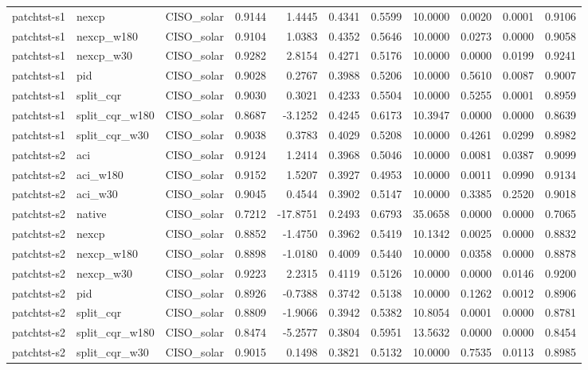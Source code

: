 \begin{tabular}{lllrrrrrrrr}
patchtst-s1 & nexcp & CISO_solar & 0.9144 & 1.4445 & 0.4341 & 0.5599 & 10.0000 & 0.0020 & 0.0001 & 0.9106 \\
patchtst-s1 & nexcp_w180 & CISO_solar & 0.9104 & 1.0383 & 0.4352 & 0.5646 & 10.0000 & 0.0273 & 0.0000 & 0.9058 \\
patchtst-s1 & nexcp_w30 & CISO_solar & 0.9282 & 2.8154 & 0.4271 & 0.5176 & 10.0000 & 0.0000 & 0.0199 & 0.9241 \\
patchtst-s1 & pid & CISO_solar & 0.9028 & 0.2767 & 0.3988 & 0.5206 & 10.0000 & 0.5610 & 0.0087 & 0.9007 \\
patchtst-s1 & split_cqr & CISO_solar & 0.9030 & 0.3021 & 0.4233 & 0.5504 & 10.0000 & 0.5255 & 0.0001 & 0.8959 \\
patchtst-s1 & split_cqr_w180 & CISO_solar & 0.8687 & -3.1252 & 0.4245 & 0.6173 & 10.3947 & 0.0000 & 0.0000 & 0.8639 \\
patchtst-s1 & split_cqr_w30 & CISO_solar & 0.9038 & 0.3783 & 0.4029 & 0.5208 & 10.0000 & 0.4261 & 0.0299 & 0.8982 \\
patchtst-s2 & aci & CISO_solar & 0.9124 & 1.2414 & 0.3968 & 0.5046 & 10.0000 & 0.0081 & 0.0387 & 0.9099 \\
patchtst-s2 & aci_w180 & CISO_solar & 0.9152 & 1.5207 & 0.3927 & 0.4953 & 10.0000 & 0.0011 & 0.0990 & 0.9134 \\
patchtst-s2 & aci_w30 & CISO_solar & 0.9045 & 0.4544 & 0.3902 & 0.5147 & 10.0000 & 0.3385 & 0.2520 & 0.9018 \\
patchtst-s2 & native & CISO_solar & 0.7212 & -17.8751 & 0.2493 & 0.6793 & 35.0658 & 0.0000 & 0.0000 & 0.7065 \\
patchtst-s2 & nexcp & CISO_solar & 0.8852 & -1.4750 & 0.3962 & 0.5419 & 10.1342 & 0.0025 & 0.0000 & 0.8832 \\
patchtst-s2 & nexcp_w180 & CISO_solar & 0.8898 & -1.0180 & 0.4009 & 0.5440 & 10.0000 & 0.0358 & 0.0000 & 0.8878 \\
patchtst-s2 & nexcp_w30 & CISO_solar & 0.9223 & 2.2315 & 0.4119 & 0.5126 & 10.0000 & 0.0000 & 0.0146 & 0.9200 \\
patchtst-s2 & pid & CISO_solar & 0.8926 & -0.7388 & 0.3742 & 0.5138 & 10.0000 & 0.1262 & 0.0012 & 0.8906 \\
patchtst-s2 & split_cqr & CISO_solar & 0.8809 & -1.9066 & 0.3942 & 0.5382 & 10.8054 & 0.0001 & 0.0000 & 0.8781 \\
patchtst-s2 & split_cqr_w180 & CISO_solar & 0.8474 & -5.2577 & 0.3804 & 0.5951 & 13.5632 & 0.0000 & 0.0000 & 0.8454 \\
patchtst-s2 & split_cqr_w30 & CISO_solar & 0.9015 & 0.1498 & 0.3821 & 0.5132 & 10.0000 & 0.7535 & 0.0113 & 0.8985 \\

\end{tabular}

